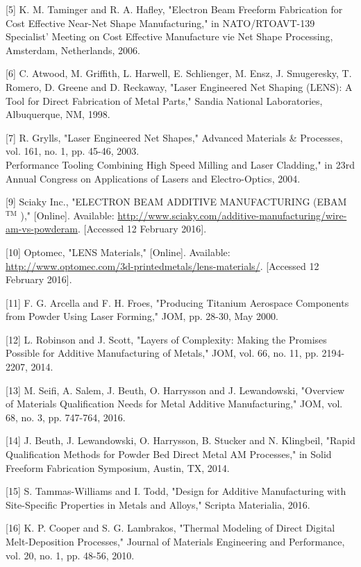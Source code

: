 \documentclass[10pt]{article}
\begin{document}
[5] K. M. Taminger and R. A. Hafley, "Electron Beam Freeform Fabrication for Cost Effective Near-Net Shape Manufacturing," in NATO/RTOAVT-139 Specialist' Meeting on Cost Effective Manufacture vie Net Shape Processing, Amsterdam, Netherlands, 2006.

[6] C. Atwood, M. Griffith, L. Harwell, E. Schlienger, M. Ensz, J. Smugeresky, T. Romero, D. Greene and D. Reckaway, "Laser Engineered Net Shaping (LENS): A Tool for Direct Fabrication of Metal Parts," Sandia National Laboratories, Albuquerque, NM, 1998.

[7] R. Grylls, "Laser Engineered Net Shapes," Advanced Materials \& Processes, vol. 161, no. 1, pp. 45-46, 2003.\\
Performance Tooling Combining High Speed Milling and Laser Cladding," in 23rd Annual Congress on Applications of Lasers and Electro-Optics, 2004.

[9] Sciaky Inc., "ELECTRON BEAM ADDITIVE MANUFACTURING (EBAM ${ }^{\mathrm{TM}}$ )," [Online]. Available: \href{http://www.sciaky.com/additive-manufacturing/wire-am-vs-powderam}{http://www.sciaky.com/additive-manufacturing/wire-am-vs-powderam}. [Accessed 12 February 2016].

[10] Optomec, "LENS Materials," [Online]. Available: \href{http://www.optomec.com/3d-printedmetals/lens-materials/}{http://www.optomec.com/3d-printedmetals/lens-materials/}. [Accessed 12 February 2016].

[11] F. G. Arcella and F. H. Froes, "Producing Titanium Aerospace Components from Powder Using Laser Forming," JOM, pp. 28-30, May 2000.

[12] L. Robinson and J. Scott, "Layers of Complexity: Making the Promises Possible for Additive Manufacturing of Metals," JOM, vol. 66, no. 11, pp. 2194-2207, 2014.

[13] M. Seifi, A. Salem, J. Beuth, O. Harrysson and J. Lewandowski, "Overview of Materials Qualification Needs for Metal Additive Manufacturing," JOM, vol. 68, no. 3, pp. 747-764, 2016.

[14] J. Beuth, J. Lewandowski, O. Harrysson, B. Stucker and N. Klingbeil, "Rapid Qualification Methods for Powder Bed Direct Metal AM Processes," in Solid Freeform Fabrication Symposium, Austin, TX, 2014.

[15] S. Tammas-Williams and I. Todd, "Design for Additive Manufacturing with Site-Specific Properties in Metals and Alloys," Scripta Materialia, 2016.

[16] K. P. Cooper and S. G. Lambrakos, "Thermal Modeling of Direct Digital Melt-Deposition Processes," Journal of Materials Engineering and Performance, vol. 20, no. 1, pp. 48-56, 2010.
\end{document}
